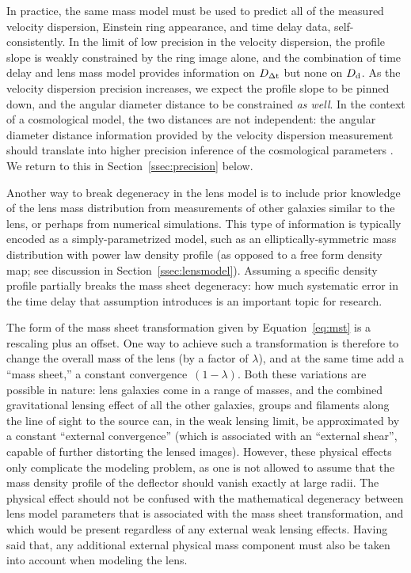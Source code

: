 In practice, the same mass model must be used to predict all of the
measured velocity dispersion, Einstein ring appearance, and time
delay data, self-consistently. In the limit of low precision in the
velocity dispersion, the profile slope is weakly constrained by the
ring image alone, and the combination of time delay and lens mass
model provides information on $D_{\Delta{\rm t}}$ but none on $D_{\rm d}$. As the
velocity dispersion precision increases, we expect the profile slope
to be pinned down, and the angular diameter distance to be constrained
{\it as well}. In the context of a cosmological model, the two
distances are not independent: the angular diameter distance
information provided by the velocity dispersion measurement should
translate into higher precision inference of the cosmological
parameters \citep{JeeEtal2016}.  We return to this in
Section~\ref{ssec:precision} below.

Another way to break degeneracy in the lens model is to include prior
knowledge of the lens mass distribution from measurements of other
galaxies similar to the lens, or perhaps from numerical
simulations. This type of information is typically encoded as a
simply-parametrized model, such as an elliptically-symmetric mass
distribution with power law density profile (as opposed to a free form
density map; see discussion in Section~\ref{ssec:lensmodel}). Assuming
a specific density profile partially breaks the mass sheet degeneracy:
how much systematic error in the time delay that assumption introduces
is an important topic for research.


The form of the mass sheet transformation given by
Equation~\ref{eq:mst} is a rescaling plus an offset. One way to
achieve such a transformation is therefore to change the overall mass
of the lens (by a factor of $\lambda$), and at the same time add a
``mass sheet,'' a constant convergence~$(1-\lambda)$.  Both these
variations are possible in nature: lens galaxies come in a range of
masses, and the combined gravitational lensing effect of all the other
galaxies, groups and filaments along the line of sight to the source
can, in the weak lensing limit, be approximated by a constant
``external convergence'' (which is associated with an ``external shear'',
capable of further distorting the lensed images). However, these
physical effects only complicate the modeling problem, as one is not
allowed to assume that the mass density profile of the deflector
should vanish exactly at large radii.  The physical effect should not
be confused with the mathematical degeneracy between lens model
parameters that is associated with the mass sheet transformation, and
which would be present regardless of any external weak lensing
effects. Having said that, any additional external physical mass
component must also be taken into account when modeling the lens.

